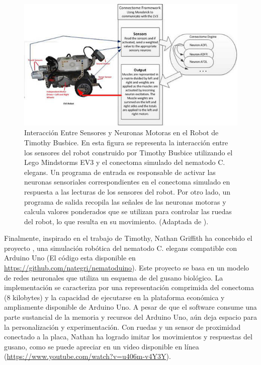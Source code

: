 \begin{figure}[h!]
	\centering\includegraphics[width=\imsize]{connectomerobot.jpg}
	\caption[ Interacción Entre Sensores y Neuronas Motoras en el Robot de Timothy Busbice.]{  Interacción Entre Sensores y Neuronas Motoras en el Robot de Timothy Busbice. En esta figura se representa la interacción entre los sensores del robot construido por Timothy Busbice utilizando el Lego Mindstorms EV3 y el conectoma simulado del nematodo C. elegans. Un programa de entrada es responsable de activar las neuronas sensoriales correspondientes en el conectoma simulado en respuesta a las lecturas de los sensores del robot. Por otro lado, un programa de salida recopila las señales de las neuronas motoras y calcula valores ponderados que se utilizan para controlar las ruedas del robot, lo que resulta en su movimiento.  (Adaptada de \protect\cite{Timothy_robot} ).}\label{fig:timoty}
\end{figure}



Finalmente, inspirado en el trabajo de Timothy, Nathan Griffith ha concebido el proyecto , una simulación robótica del nematodo C. elegans compatible con Arduino Uno (El código esta disponible en \url{https://github.com/nategri/nematoduino}). Este proyecto se basa en un modelo de redes neuronales que utiliza un esquema de  del gusano biológico.  La implementación se caracteriza por una representación comprimida del conectoma (8 kilobytes) y la capacidad de ejecutarse en la plataforma económica y ampliamente disponible de Arduino Uno. A pesar de que el software  consume una parte sustancial de la memoria y recursos del Arduino Uno, aún deja espacio para la personalización y experimentación. Con ruedas y un sensor de proximidad conectado a la placa, Nathan ha logrado imitar los movimientos y respuestas del gusano, como se puede apreciar en un video disponible en línea (\url{https://www.youtube.com/watch?v=u406m-v4Y3Y}).

